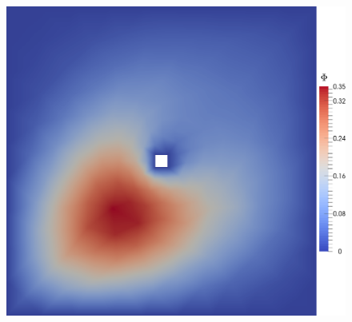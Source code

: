 \begin{test}[Diffusion Dominated ARD, $\kappa = 0.1$]
\begin{figure}[h]
\begin{minipage}[t]{0.49\textwidth}
{                \includegraphics[scale=0.1]{Figures/AdaptiveADRkappa1E-1_uDual0.png}
            }
        \end{minipage}
        \begin{minipage}[t]{0.49\textwidth}
            \centering
\end{minipage}
\end{figure}
\end{test}
